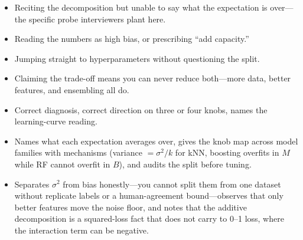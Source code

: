 \begin{interviewq}
\redflags
\begin{itemize}
    \item Reciting the decomposition but unable to say what the expectation is over---the specific probe interviewers plant here.
    \item Reading the numbers as high bias, or prescribing ``add capacity.''
    \item Jumping straight to hyperparameters without questioning the split.
    \item Claiming the trade-off means you can never reduce both---more data, better features, and ensembling all do.
\end{itemize}


\goodgreat
\begin{itemize}
    \item {} Correct diagnosis, correct direction on three or four knobs, names the learning-curve reading.
    \item {} Names what each expectation averages over, gives the knob map across model families with mechanisms (variance $=\sigma^2/k$ for kNN, boosting overfits in $M$ while RF cannot overfit in $B$), and audits the split before tuning.
    \item {} Separates $\sigma^2$ from bias honestly---you cannot split them from one dataset without replicate labels or a human-agreement bound---observes that only better features move the noise floor, and notes that the additive decomposition is a squared-loss fact that does not carry to 0--1 loss, where the interaction term can be negative.
\end{itemize}

\end{interviewq}

